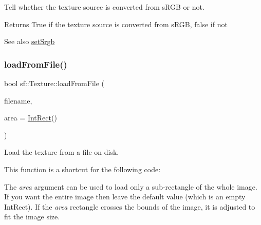 Tell whether the texture source is converted from s\+R\+GB or not. 

\begin{DoxyReturn}{Returns}
True if the texture source is converted from s\+R\+GB, false if not
\end{DoxyReturn}
\begin{DoxySeeAlso}{See also}
\mbox{\hyperlink{classsf_1_1_texture_af8a38872c50a33ff074bd0865db19dd4}{set\+Srgb}} \begin{DoxyVerb}\end{DoxyVerb}
 
\end{DoxySeeAlso}
\mbox{\label{classsf_1_1_texture_a8e1b56eabfe33e2e0e1cb03712c7fcc7}} 
\subsubsection{\texorpdfstring{loadFromFile()}{loadFromFile()}}
{\footnotesize\ttfamily bool sf\+::\+Texture\+::load\+From\+File (\begin{DoxyParamCaption}\item[{const std\+::string \&}]{filename,  }\item[{const \mbox{\hyperlink{classsf_1_1_rect}{Int\+Rect}} \&}]{area = {\ttfamily \mbox{\hyperlink{classsf_1_1_rect}{Int\+Rect}}()} }\end{DoxyParamCaption})}



Load the texture from a file on disk. 

This function is a shortcut for the following code\+: 
\begin{DoxyCode}{0}
\end{DoxyCode}


The {\itshape area} argument can be used to load only a sub-\/rectangle of the whole image. If you want the entire image then leave the default value (which is an empty Int\+Rect). If the {\itshape area} rectangle crosses the bounds of the image, it is adjusted to fit the image size.

